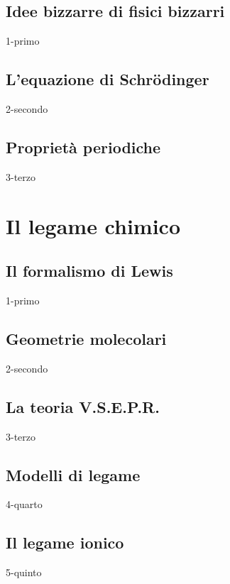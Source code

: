 \documentclass[openany,12pt]{book}%
\begin{document}
\section{Idee bizzarre di fisici bizzarri}
{1-primo}

\section{L'equazione di Schrödinger}
{2-secondo}

\section{Proprietà periodiche}
{3-terzo}

\chapter{Il legame chimico}

\section{Il formalismo di Lewis}
{1-primo}

\newpage

\section{Geometrie molecolari}
{2-secondo}

\newpage

\section{La teoria V.S.E.P.R.}
{3-terzo}

\newpage

\section{Modelli di legame}
{4-quarto}

\newpage

\section{Il legame ionico}
{5-quinto}
\end{document}
